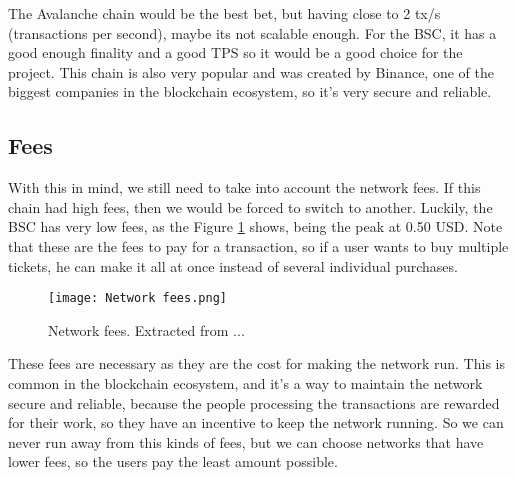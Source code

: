 The Avalanche chain would be the best bet, but having close to 2 tx/s
(transactions per second), maybe its not scalable enough. For the BSC, it has a
good enough finality and a good TPS so it would be a good choice for the
project. This chain is also very popular and was created by Binance, one of the
biggest companies in the blockchain ecosystem, so it's very secure and
reliable.

\subsection{Fees}
\label{subsec:fees}

With this in mind, we still need to take into account the network fees. If this
chain had high fees, then we would be forced to switch to another. Luckily, the
BSC has very low fees, as the Figure \ref{fig:network_fees} shows, being the
peak at 0.50 USD. Note that these are the fees to pay for a transaction, so if
a user wants to buy multiple tickets, he can make it all at once instead of
several individual purchases.

\begin{figure}[H]
    \texttt{[image: Network fees.png]}
    \centering
    \caption{Network fees. Extracted from ...}
    \label{fig:network_fees}
\end{figure}

These fees are necessary as they are the cost for making the network run. This
is common in the blockchain ecosystem, and it's a way to maintain the network
secure and reliable, because the people processing the transactions are
rewarded for their work, so they have an incentive to keep the network running.
So we can never run away from this kinds of fees, but we can choose networks
that have lower fees, so the users pay the least amount possible.
